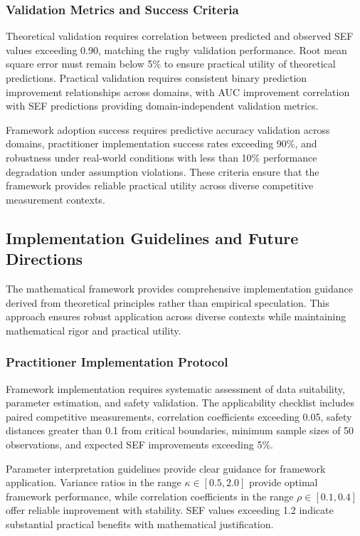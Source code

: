 \subsubsection{Validation Metrics and Success Criteria}

Theoretical validation requires correlation between predicted and observed SEF values exceeding 0.90, matching the rugby validation performance. Root mean square error must remain below 5\% to ensure practical utility of theoretical predictions. Practical validation requires consistent binary prediction improvement relationships across domains, with AUC improvement correlation with SEF predictions providing domain-independent validation metrics.

Framework adoption success requires predictive accuracy validation across domains, practitioner implementation success rates exceeding 90\%, and robustness under real-world conditions with less than 10\% performance degradation under assumption violations. These criteria ensure that the framework provides reliable practical utility across diverse competitive measurement contexts.

\subsection{Implementation Guidelines and Future Directions}

The mathematical framework provides comprehensive implementation guidance derived from theoretical principles rather than empirical speculation. This approach ensures robust application across diverse contexts while maintaining mathematical rigor and practical utility.

\subsubsection{Practitioner Implementation Protocol}

Framework implementation requires systematic assessment of data suitability, parameter estimation, and safety validation. The applicability checklist includes paired competitive measurements, correlation coefficients exceeding 0.05, safety distances greater than 0.1 from critical boundaries, minimum sample sizes of 50 observations, and expected SEF improvements exceeding 5\%.

Parameter interpretation guidelines provide clear guidance for framework application. Variance ratios in the range $\kappa \in [0.5, 2.0]$ provide optimal framework performance, while correlation coefficients in the range $\rho \in [0.1, 0.4]$ offer reliable improvement with stability. SEF values exceeding 1.2 indicate substantial practical benefits with mathematical justification.


